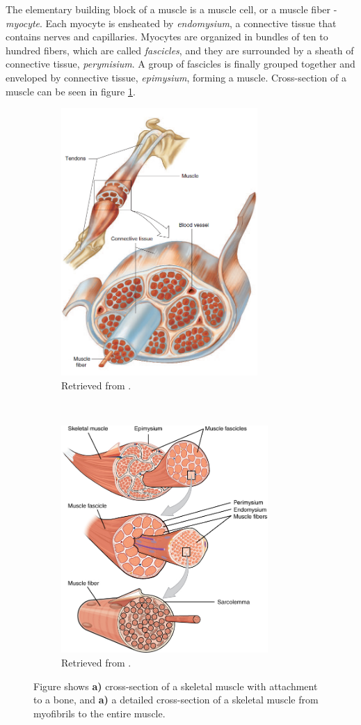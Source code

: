 The elementary building block of a muscle is a muscle cell, or a muscle fiber - \emph{myocyte}. Each myocyte is ensheated by \emph{endomysium}, a connective tissue that contains nerves and capillaries. Myocytes are organized in bundles of ten to hundred fibers, which are called \emph{fascicles}, and they are surrounded by a sheath of connective tissue, \emph{perymisium}. A group of fascicles is finally grouped together and enveloped by connective tissue, \emph{epimysium}, forming a muscle. Cross-section of a muscle can be seen in figure \ref{fig:muscle}.
\begin{figure}[htb!]
    \centering
    \begin{subfigure}[t]{0.49\textwidth}
        \centering
        \includegraphics[height=4in]{Images/introduction/muscle.png}
        \caption{Retrieved from \citet{Widmaier2014}.}
    \end{subfigure}%
    ~ 
    \begin{subfigure}[t]{0.49\textwidth}
        \centering
        \includegraphics[height=3.4in]{Images/introduction/Muscle_Fibers.png}
        \caption{Retrieved from \citet{OpenStax2013}.}
    \end{subfigure}
    \caption{Figure shows \textbf{a)} cross-section of a skeletal muscle with attachment to a bone, and \textbf{a)} a detailed cross-section of a skeletal muscle from myofibrils to the entire muscle.}
\label{fig:muscle}
\end{figure}
